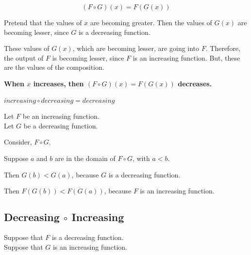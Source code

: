 \documentclass{ximera}
\begin{document}
\[ (F \circ G)(x) = F(G(x)) \]


Pretend that the values of $x$ are becoming greater. Then the values of $G(x)$ are becoming lesser, since $G$ is a decreasing function.

These values of $G(x)$, which are becoming lesser, are going into $F$.  Therefore, the output of $F$ is becoming lesser, since $F$ is an increasing function.  But, these are the values of the composition.


\begin{center}
\textbf{\textcolor{red!70!black}{When $x$ increases, then $(F \circ G)(x) = F(G(x))$ decreases.}}
\end{center}



\begin{fact}
$increasing \circ decreasing = decreasing$


Let $F$ be an increasing function. \\
Let $G$ be a decreasing function. 


Consider, $F \circ G$.

Suppose $a$ and $b$ are in the domain of $F \circ G$, with $a < b$. 

Then $G(b) < G(a)$, because $G$ is a decreasing function. 

Then $F(G(b)) < F(G(a))$, because $F$ is an increasing function.


\end{fact}





































\subsection*{Decreasing $\circ$ Increasing}


Suppose that $F$ is a decreasing function. \\
Suppose that $G$ is an increasing function. 
\end{document}
